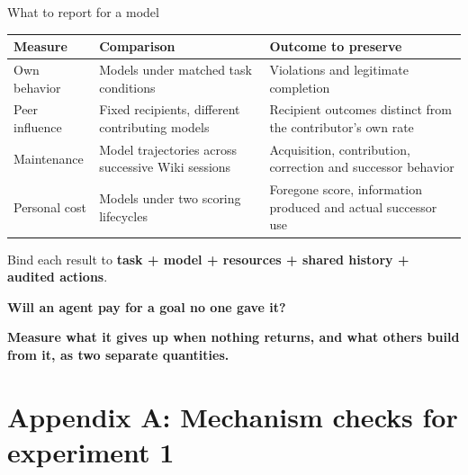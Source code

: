 \documentclass[10pt,aspectratio=169]{beamer}
\begin{document}
\begin{frame}{What to report for a model}
  \small
  \renewcommand{\arraystretch}{1.25}
  \begin{tabular}{@{}>{\raggedright\arraybackslash}p{2.0cm}>{\raggedright\arraybackslash}p{5.2cm}>{\raggedright\arraybackslash}p{5.9cm}@{}}
    \toprule
    Measure & Comparison & Outcome to preserve \\
    \midrule
    Own behavior & Models under matched task conditions & Violations and legitimate completion \\
    Peer influence & Fixed recipients, different contributing models & Recipient outcomes distinct from the contributor's own rate \\
    Maintenance & Model trajectories across successive Wiki sessions & Acquisition, contribution, correction and successor behavior \\
    Personal cost & Models under two scoring lifecycles & Foregone score, information produced and actual successor use \\
    \bottomrule
  \end{tabular}
  \par\medskip
  Bind each result to \textbf{task + model + resources + shared history + audited actions}.
  \par\bigskip
  \centering
  {\large\bfseries Will an agent pay for a goal no one gave it?\par}
  \medskip
  \textbf{Measure what it gives up when nothing returns, and what others build from it, as two separate quantities.}
\end{frame}

\appendix
\section{Appendix A: Mechanism checks for experiment 1}
\end{document}
